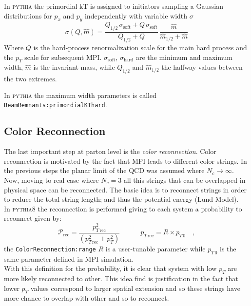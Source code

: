 \medskip

In \textsc{pythia} the primordial kT is assigned to initiators sampling a Gaussian distributions for $p_x$ and $p_y$ independently with variable width $\sigma$
\begin{equation}
	\sigma(Q,\widehat{m})=\frac{Q_{1/2}\,\sigma_{\text{soft}}+Q\,\sigma_{\text{soft}}}{Q_{1/2}+Q}\,\frac{\widehat{m}}{\widehat{m}_{1/2}+\widehat{m}}
\end{equation}
Where $Q$ is the hard-process renormalization scale for the main hard process and the $p_T$ scale for subsequent MPI. $\sigma_{\text{soft}}$, $\sigma_{\text{hard}}$ are the minimum and maximum width, $\widehat{m}$ is the invariant mass, while $Q_{1/2}$ and $\widehat{m}_{1/2}$ the halfway values between the two extremes.

In \textsc{pythia} the maximum width parameters is called \texttt{Beam}\-\texttt{Remnants:}\-\texttt{primordialKT}\-\texttt{hard}.

\subsection{Color Reconnection}

The last important step at parton level is the \textit{color reconnection}. Color reconnection is motivated by the fact that MPI leads to different color strings. In the previous steps the planar limit of the QCD was assumed where $N_c\rightarrow\infty$. Now, moving to real case where $N_c=3$ all this strings that can be overlapped in physical space can be reconnected. The basic idea is to reconnect strings in order to reduce the total string length; and thus the potential energy (Lund Model).
\\
In \textsc{pythia8} the reconnection is performed giving to each system a probability to reconnect given by:
\begin{equation}
	\mathcal{P}_{\text{rec}}=\frac{p_{T\,\text{rec}}^2}{\left(p_{T\,\text{rec}}^2 + p_T^2\right)} \qquad\quad p_{T\,\text{rec}}=R\times p_{T\,0}\quad,
\end{equation} 
the \texttt{ColorReconnection:range} $R$ is a user-tunable parameter while $p_{T\,0}$ is the same parameter defined in MPI simulation.
\\
With this definition for the probability, it is clear that system with low $p_T$ are more likely reconnected to other. This idea find is justification in the fact that lower $p_T$ values correspond to larger spatial extension and so these strings have more chance to overlap with other and so to reconnect.

